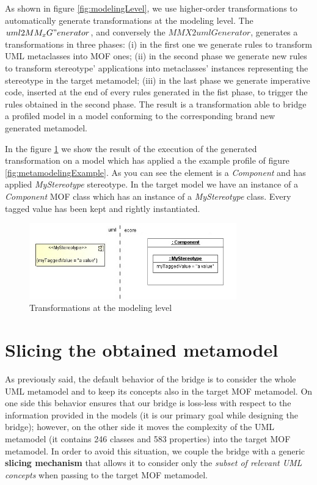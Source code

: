As shown in figure \ref{fig:modelingLevel}, we use higher-order transformations to automatically generate transformations at the modeling level. The $uml2MM_xG"enerator$, and conversely the $MMX2umlGenerator$, generates a transformations in three phases: (i) in the first one we generate rules to transform UML metaclasses into MOF ones; (ii) in the second phase we generate new rules to transform stereotype' applications into metaclasses' instances representing the stereotype in the target metamodel; (iii) in the last phase we generate imperative code, inserted at the end of every rules generated in the fist phase, to trigger the rules obtained in the second phase. The result is a transformation able to bridge a profiled model in a model conforming to the corresponding brand new generated metamodel.

In the figure \ref{fig:modelingExample} we show the result of the execution of the generated transformation on a model which has applied a the example profile of figure \ref{fig:metamodelingExample}. As you can see the element is a \textit{Component} and has applied \textit{MyStereotype} stereotype. In the target model we have an instance of a \textit{Component} MOF class which has an instance of a \textit{MyStereotype} class. Every tagged value has been kept and rightly instantiated.
%
\begin{figure}[htbp]
	\centering
		\includegraphics[width=0.80\textwidth]{figures/modelingExample.jpg}
	\caption{Transformations at the modeling level}
	\label{fig:modelingExample}
\end{figure}
%

\section{Slicing the obtained metamodel}\label{sec:slicing}

As previously said, the default behavior of the bridge is to consider the whole UML metamodel and to keep its concepts also in the
target MOF metamodel. On one side this behavior ensures that our bridge is loss-less with respect to the information
provided in the models (it is our primary goal while designing the bridge);
however, on the other side it moves the complexity of the UML metamodel (it contains 246 classes and 583 properties)
into the target MOF metamodel. 
In order to avoid this situation, we couple the bridge with a generic \textbf{slicing mechanism} that allows it to consider  
only the \textit{subset of relevant UML concepts} when passing to the target MOF metamodel.

